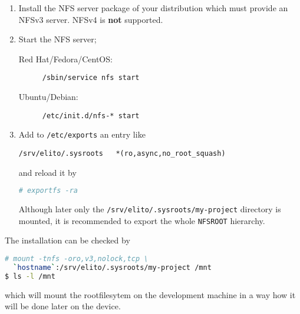 \begin{enumerate}[resume]
\item Install the NFS server package of your distribution which must
  provide an NFSv3 server. NFSv4 is \textbf{not} supported.
\item Start the NFS server;

  \begin{description}
  \item[Red Hat/Fedora/CentOS:] \lstinline[language=sh]{/sbin/service nfs start}
  \item[Ubuntu/Debian:] \lstinline[language=sh]{/etc/init.d/nfs-* start}
  \end{description}
\item Add to \texttt{/etc/exports} an entry like
\begin{verbatim}
/srv/elito/.sysroots   *(ro,async,no_root_squash)
\end{verbatim} and reload it by
\begin{lstlisting}[language=sh]
# exportfs -ra
\end{lstlisting}

  Although later only the \texttt{/srv/elito/.sysroots/my-project}
  directory is mounted, it is recommended to export the whole
  \texttt{NFSROOT} hierarchy.

\end{enumerate}

The installation can be checked by
\begin{lstlisting}[language=sh]
# mount -tnfs -oro,v3,nolock,tcp \
  `hostname`:/srv/elito/.sysroots/my-project /mnt
$ ls -l /mnt
\end{lstlisting}%
  which will mount the rootfilesytem on the development machine in a
  way how it will be done later on the device.


